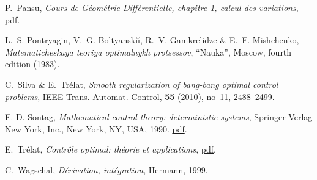 \begin{thebibliography}{1}
\newblock P.~Pansu,
\newblock \emph{Cours de G\'eom\'etrie Diff\'erentielle, chapitre 1, calcul des variations},
\newblock \href{http://www.math.u-psud.fr/\%7Epansu/web_dea/chapitre1.pdf}{pdf}.

\newblock L.~S. Pontryagin, V.~G. Boltyanski{\u\i}, R.~V. Gamkrelidze \& E.~F. Mishchenko,
\newblock \emph{Matematicheskaya teoriya optimalnykh protsessov},
\newblock ``Nauka'', Moscow, fourth edition (1983).

\newblock C.~Silva \& E.~Tr{\'e}lat,
\newblock \emph{Smooth regularization of bang-bang optimal control problems},
\newblock IEEE Trans. Automat. Control, \textbf{55} (2010), no~11, 2488--2499.

\newblock E. D. Sontag,
\newblock \emph{Mathematical control theory: deterministic systems},
\newblock Springer-Verlag New York, Inc., New York, NY, USA, 1990.
\newblock \href{http://www.math.rutgers.edu/~sontag/FTP_DIR/sontag_mathematical_control_theory_springer98.pdf}{pdf}.

\newblock E.~Tr{\'e}lat,
\newblock \emph{Contr\^ole optimal\NoAutoSpaceBeforeFDP: th\'eorie et applications},
\newblock \href{https://www.ljll.math.upmc.fr/trelat/fichiers/livreopt.pdf}{pdf}.

\newblock C.~Wagschal,
\newblock \emph{D\'erivation, int\'egration},
\newblock Hermann, 1999.

\end{thebibliography}
